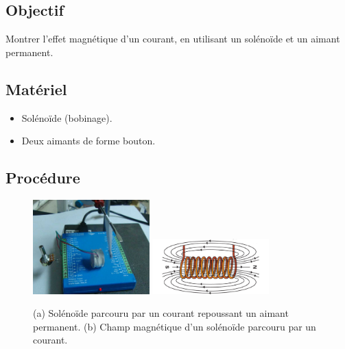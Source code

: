 \documentclass{book}
\begin{document}
 \label{sec:Magnetic-Effect-of}

\subsection{Objectif}


Montrer l'effet magnétique d'un courant, en utilisant un solénoïde et un aimant permanent.




\subsection{Matériel}


\begin{itemize}
  \item Solénoïde (bobinage).
  \item Deux aimants de forme bouton.
\end{itemize}

\subsection{Procédure}


\begin{figure}[h!]
\begin{center}
\caption{\label{fig:Solenoid-Magnetic-field}(a) Solénoïde parcouru par un courant repoussant un aimant permanent. (b) Champ magnétique d'un solénoïde parcouru par un courant. }\vspace{0.5em}
\includegraphics[width=0.4\textwidth, height=0.3\textwidth, keepaspectratio]{Schematic-coil-magnetpendulum-photo.png}
\includegraphics[width=0.4\textwidth, height=0.3\textwidth, keepaspectratio]{Pic-solenoid-field.png}
\end{center}
\end{figure}
\end{document}
